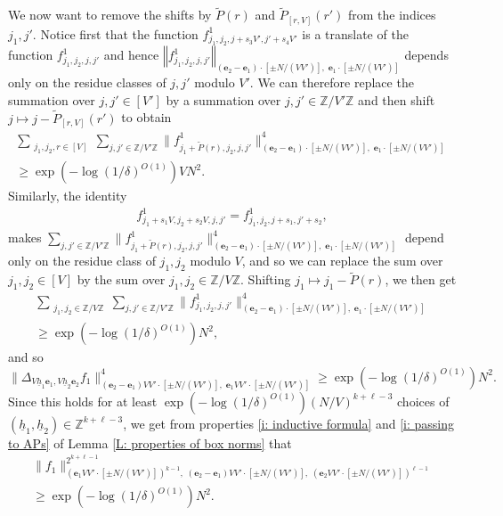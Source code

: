 \documentclass[11pt]{amsart}
\theoremstyle{definition}
\newcommand{\Z}{{\mathbb Z}}
\newcommand{\be}{{\mathbf{e}}}
\newcommand{\uh}{{\underline{h}}}
\newcommand{\norm}[1]{\left\Vert #1\right\Vert}
\begin{document}
We now want to remove the shifts by $\widetilde P(r)$ and $\widetilde P_{[r, V]}(r')$ from the indices $j_1, j'$. 
Notice first that the function $f^1_{j_1,j_2, j+s_3V', j'+s_4V'}$ is a translate of the function $f^1_{j_1,j_2, j, j'}$ and hence $\norm{f^1_{j_1,j_2, j,j'}}_{(\be_2 - \be_1)\cdot[\pm N/(VV')],\; \be_1\cdot[\pm N/(VV')]}$ depends only on the residue classes of $j,j'$ modulo $V'$. We can therefore replace the summation over $j,j'\in[V']$ by a summation over $j,j'\in\Z/V'\Z$ and then shift $j \mapsto j - \widetilde P_{[r, V]}(r')$ to obtain
\begin{multline*}
    \sum_{\substack{j_1, j_2, r\in [V]}}\sum_{j,j'\in\Z/V'\Z}\|f^1_{j_1 + \widetilde P(r), j_2, j, j'}\|_{(\be_2 - \be_1)\cdot[\pm N/(VV')],\; \be_1\cdot[\pm N/(VV')]}^4\\
    \geq \exp(-\log(1/\delta)^{O(1)}) V N^2.
\end{multline*}
Similarly, the identity
\begin{align*}
    f^1_{j_1+s_1V,j_2+s_2V, j, j'} = f^1_{j_1,j_2, j+s_1, j'+s_2},
\end{align*}
makes $\sum_{j,j'\in\Z/V'\Z}\|f^1_{j_1 + \widetilde P(r), j_2, j, j'}\|_{(\be_2 - \be_1)\cdot[\pm N/(VV')],\; \be_1\cdot[\pm N/(VV')]}^4$ depend only on the residue class of $j_1, j_2$ modulo $V$, and so we can replace the sum over $j_1, j_2\in[V]$ by the sum over $j_1, j_2\in\Z/V\Z$. Shifting $j_1\mapsto j_1 - \tilde{P}(r)$, we then get
\begin{multline*}
    \sum_{\substack{j_1, j_2\in \Z/V\Z}}\sum_{j,j'\in\Z/V'\Z}\|f^1_{j_1, j_2, j, j'}\|_{(\be_2 - \be_1)\cdot[\pm N/(VV')],\; \be_1\cdot[\pm N/(VV')]}^4\\
    \geq \exp(-\log(1/\delta)^{O(1)}) N^2,
\end{multline*}
and so
$$\|\Delta_{V\uh_1 \be_1,V\uh_2 \be_2}f_1\|_{(\be_2 - \be_1)VV' \cdot [\pm N/(VV')],\; \be_1VV' \cdot [\pm N/(VV')]}^4 \geq \exp(-\log(1/\delta)^{O(1)}) N^2.$$
Since this holds for at least $\exp(-\log(1/\delta)^{O(1)})(N/V)^{k+\ell-3}$ choices of $(\uh_1, \uh_2)\in\Z^{k+\ell-3}$, we get from properties \eqref{i: inductive formula} and \eqref{i: passing to APs} of Lemma \ref{L: properties of box norms} that
\begin{multline}\label{E: auxiliary bound}
    \|f_1\|^{2^{k+\ell-1}}_{(\be_1 VV' \cdot [\pm N/(VV')])^{k - 1},\; (\be_2 - \be_1)VV' \cdot [\pm N/(VV')],\; (\be_2 VV' \cdot [\pm N/(VV')])^{\ell-1}}\\ \geq \exp(-\log(1/\delta)^{O(1)}) N^2.
\end{multline}
\end{document}
